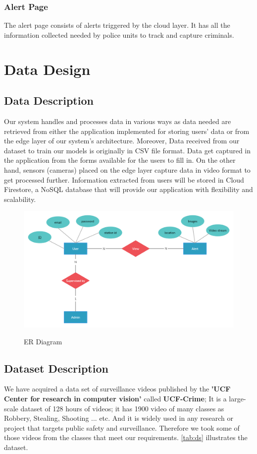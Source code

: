 \documentclass[12pt]{article}
\begin{document}
\subsubsection{Alert Page}
The alert page consists of alerts triggered by the cloud layer. It has all the information collected needed by police units to track and capture criminals.

\section{Data Design}
\subsection{Data Description}
Our system handles and processes data in various ways as data needed are retrieved from either the application implemented for storing users’ data or from the edge layer of our system’s architecture. Moreover, Data received from our dataset to train our models is originally in CSV file format. Data get captured in the application from the forms available for the users to fill in. On the other hand, sensors (cameras) placed on the edge layer capture data in video format to get processed further. Information extracted from users will be stored in Cloud Firestore, a NoSQL database that will provide our application with flexibility and scalability.
\begin{figure}[h]
  \centering
  \includegraphics[width=15cm]{ERdiagram.jpg}
  \label{fig:2}
   \caption{ER Diagram}
\end{figure}

\newpage
\subsection{Dataset Description}
We have acquired a data set of surveillance videos published by the \textbf{ 'UCF Center for research in computer vision'} called  \textbf{ UCF-Crime}; It is a large-scale dataset of 128 hours of videos; it has 1900 video of many classes as Robbery, Stealing, Shooting ... etc. And it is widely used in any research or project that targets public safety and surveillance. Therefore we took some of those videos from the classes that meet our requirements. \ref{tab:ds} illustrates the dataset.
\end{document}
